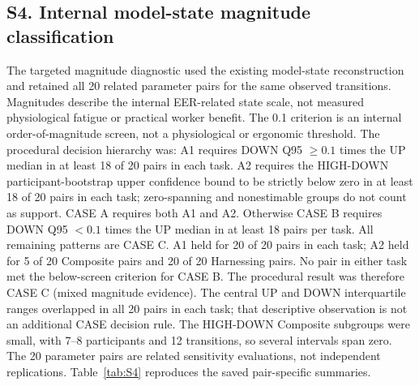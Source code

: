 \documentclass[10pt]{article}
\begin{document}
\begin{landscape}
\thispagestyle{empty}

\section*{S4. Internal model-state magnitude classification}
The targeted magnitude diagnostic used the existing model-state reconstruction and retained all 20 related parameter pairs for the same observed transitions. Magnitudes describe the internal EER-related state scale, not measured physiological fatigue or practical worker benefit. The 0.1 criterion is an internal order-of-magnitude screen, not a physiological or ergonomic threshold.
The procedural decision hierarchy was: A1 requires DOWN Q95 $\geq 0.1$ times the UP median in at least 18 of 20 pairs in each task. A2 requires the HIGH-DOWN participant-bootstrap upper confidence bound to be strictly below zero in at least 18 of 20 pairs in each task; zero-spanning and nonestimable groups do not count as support. CASE A requires both A1 and A2. Otherwise CASE B requires DOWN Q95 $<0.1$ times the UP median in at least 18 pairs per task. All remaining patterns are CASE C.
A1 held for 20 of 20 pairs in each task; A2 held for 5 of 20 Composite pairs and 20 of 20 Harnessing pairs. No pair in either task met the below-screen criterion for CASE B. The procedural result was therefore CASE C (mixed magnitude evidence). The central UP and DOWN interquartile ranges overlapped in all 20 pairs in each task; that descriptive observation is not an additional CASE decision rule. The HIGH-DOWN Composite subgroups were small, with 7--8 participants and 12 transitions, so several intervals span zero. The 20 parameter pairs are related sensitivity evaluations, not independent replications. Table~\ref{tab:S4} reproduces the saved pair-specific summaries.

\end{landscape}
\end{document}
